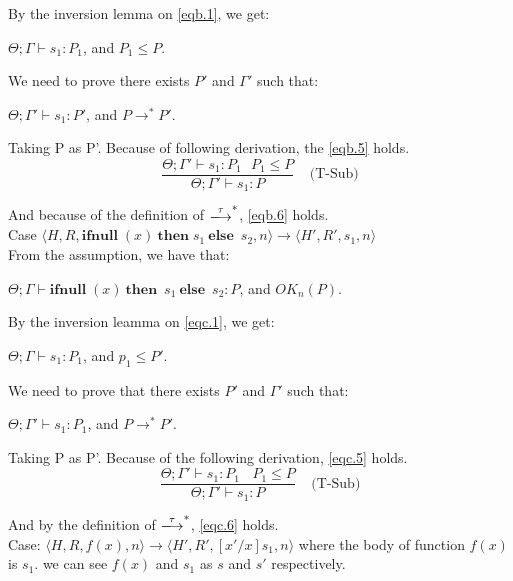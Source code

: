 \documentclass[english]{jssst_ppl} %
\newcommand\Rtab{\; \; \; \;}
\newcommand\IFNULL{\mathbf{ifnull}\;}
\newcommand\THEN{\mathbf{then}\;}
\newcommand\ELSE{\mathbf{else}\;}
\newcommand\Cirx{(x)}
\begin{document}
By the inversion lemma on \eqref{eqb.1}, we get:
\begin{center}
$\Theta; \Gamma \vdash s_{1} : P_{1}$, and $P_{1} \le P$.
\end{center}

We need to prove there exists $P'$ and $\Gamma'$ such that:
\begin{center}
$\Theta; \Gamma' \vdash s_{1} : P'$, and $P \rightarrow^{*} P'$.
\end{center}

Taking P as P'. Because of  following derivation, the \eqref{eqb.5} holds.
$$
   \frac{\Theta; \Gamma' \vdash s_{1} : P_{1} \ \ \ P_{1} \le P}
   {\Theta; \Gamma' \vdash s_{1} : P}
   \Rtab \mbox{(T-Sub)}
$$

And because of the definition of $\xlongrightarrow{\tau}^{*}$, \eqref{eqb.6} holds. \\

\noindent Case $\langle H, R, \IFNULL \Cirx \  \THEN s_{1} \  \ELSE \  s_{2}, n \rangle \rightarrow \langle H', R',s_{1}, n \rangle $\\

From the assumption, we have that:
\begin{center}
$\Theta; \Gamma \vdash \IFNULL \Cirx \  \THEN \  s_{1} \ \ELSE \ s_{2} : P$, and $OK_{n}(P)$.
\end{center}

By the inversion leamma on \eqref{eqc.1}, we get:
\begin{center}
$\Theta; \Gamma \vdash s_{1} : P_{1}$, and $ p_{1} \le P'$.
\end{center}

We need to prove that there exists $P'$ and $\Gamma'$ such that:
\begin{center}
 $\Theta; \Gamma' \vdash s_{1} : P_{1}$, and $P \rightarrow^{*} P'$.
\end{center}

Taking P as P'. Because of the following derivation, \eqref{eqc.5} holds.
$$
  \frac{\Theta; \Gamma' \vdash s_{1} : P_{1} \ \ \ \ P_{1} \le P}
  {\Theta; \Gamma' \vdash s_{1} : P}
  \Rtab \mbox{(T-Sub)}
$$

And by the definition of $\xlongrightarrow{\tau}^{*}$, \eqref{eqc.6} holds. \\

\noindent Case: $\langle H, R, f(x) , n \rangle \rightarrow  \langle H', R', [x'/x]s_{1}, n  \rangle $ where the body of function $f(x)$ is $s_{1}$. we can see $f(x)$ and $s_{1}$ as $s$ and $s'$ respectively. \\
\end{document}
